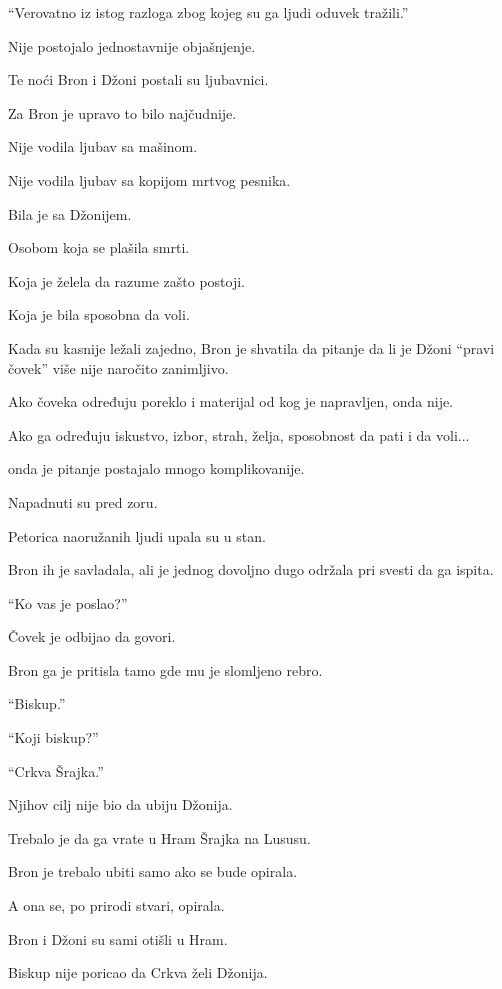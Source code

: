 ``Verovatno iz istog razloga zbog kojeg su ga ljudi oduvek tražili.''

Nije postojalo jednostavnije objašnjenje.

\bigskip

Te noći Bron i Džoni postali su ljubavnici.

Za Bron je upravo to bilo najčudnije.

Nije vodila ljubav sa mašinom.

Nije vodila ljubav sa kopijom mrtvog pesnika.

Bila je sa Džonijem.

Osobom koja se plašila smrti.

Koja je želela da razume zašto postoji.

Koja je bila sposobna da voli.

Kada su kasnije ležali zajedno, Bron je shvatila da pitanje da li je Džoni ``pravi čovek'' više nije naročito zanimljivo.

Ako čoveka određuju poreklo i materijal od kog je napravljen, onda nije.

Ako ga određuju iskustvo, izbor, strah, želja, sposobnost da pati i da voli...

onda je pitanje postajalo mnogo komplikovanije.

\bigskip

Napadnuti su pred zoru.

Petorica naoružanih ljudi upala su u stan.

Bron ih je savladala, ali je jednog dovoljno dugo održala pri svesti da ga ispita.

``Ko vas je poslao?''

Čovek je odbijao da govori.

Bron ga je pritisla tamo gde mu je slomljeno rebro.

``Biskup.''

``Koji biskup?''

``Crkva Šrajka.''

Njihov cilj nije bio da ubiju Džonija.

Trebalo je da ga vrate u Hram Šrajka na Lususu.

Bron je trebalo ubiti samo ako se bude opirala.

A ona se, po prirodi stvari, opirala.

\bigskip

Bron i Džoni su sami otišli u Hram.

Biskup nije poricao da Crkva želi Džonija.


